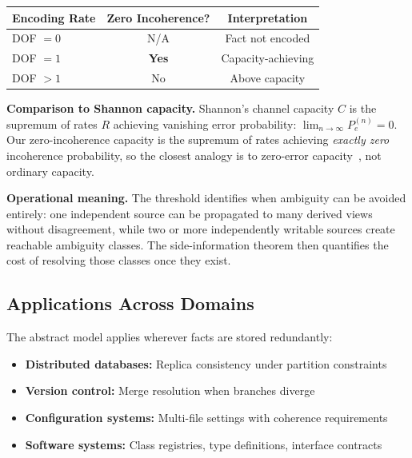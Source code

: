 \begin{center}
\begin{tabular}{lcc}
\toprule
\textbf{Encoding Rate} & \textbf{Zero Incoherence?} & \textbf{Interpretation} \\
\midrule
DOF $= 0$ & N/A & Fact not encoded \\
DOF $= 1$ & \textbf{Yes} & Capacity-achieving \\
DOF $> 1$ & No & Above capacity \\
\bottomrule
\end{tabular}
\end{center}

\textbf{Comparison to Shannon capacity.} Shannon's channel capacity $C$ is the supremum of rates $R$ achieving vanishing error probability: $\lim_{n \to \infty} P_e^{(n)} = 0$. Our zero-incoherence capacity is the supremum of rates achieving \emph{exactly zero} incoherence probability, so the closest analogy is to zero-error capacity~\cite{shannon1956zero}, not ordinary capacity.

\textbf{Operational meaning.} The threshold identifies when ambiguity can be avoided entirely: one independent source can be propagated to many derived views without disagreement, while two or more independently writable sources create reachable ambiguity classes. The side-information theorem then quantifies the cost of resolving those classes once they exist.

\subsection{Applications Across Domains}\label{sec:applications}

The abstract model applies wherever facts are stored redundantly:

\begin{itemize}
\tightlist
\item \textbf{Distributed databases:} Replica consistency under partition constraints~\cite{brewer2000cap}
\item \textbf{Version control:} Merge resolution when branches diverge~\cite{hunt2002vcdiff}
\item \textbf{Configuration systems:} Multi-file settings with coherence requirements~\cite{delaet2010survey}
\item \textbf{Software systems:} Class registries, type definitions, interface contracts~\cite{hunt1999pragmatic}
\end{itemize}

